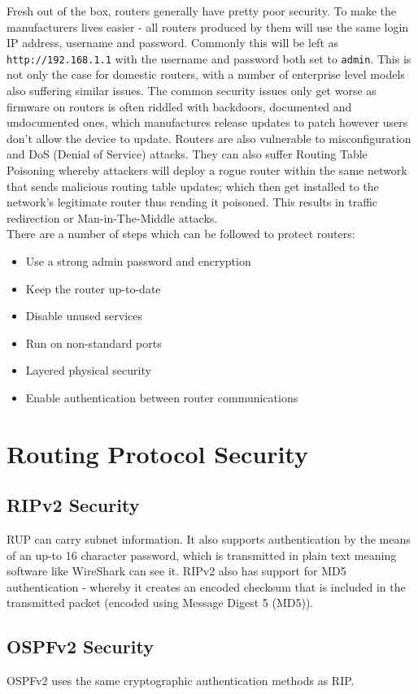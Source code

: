 Fresh out of the box, routers generally have pretty poor security. To make the manufacturers lives easier - all routers produced by them will use the same login IP address, username and password. Commonly this will be left as \verb|http://192.168.1.1| with the username and password both set to \verb|admin|. This is not only the case for domestic routers, with a number of enterprise level models also suffering similar issues. The common security issues only get worse as firmware on routers is often riddled with backdoors, documented and undocumented ones, which manufactures release updates to patch however users don't allow the device to update. Routers are also vulnerable to misconfiguration and DoS (Denial of Service) attacks. They can also suffer Routing Table Poisoning whereby attackers will deploy a rogue router within the same network that sends malicious routing table updates; which then get installed to the network's legitimate router thus rending it poisoned. This results in traffic redirection or Man-in-The-Middle attacks.\\

There are a number of steps which can be followed to protect routers:
\begin{itemize}
    \item Use a strong admin password and encryption
    \item Keep the router up-to-date
    \item Disable unused services
    \item Run on non-standard ports
    \item Layered physical security
    \item Enable authentication between router communications
\end{itemize}

\section{Routing Protocol Security}
\subsection{RIPv2 Security}
RUP can carry subnet information. It also supports authentication by the means of an up-to 16 character password, which is transmitted in plain text meaning software like WireShark can see it. RIPv2 also has support for MD5 authentication - whereby it creates an encoded checksum that is included in the transmitted packet (encoded using Message Digest 5 (MD5)). 

\subsection{OSPFv2 Security}
OSPFv2 uses the same cryptographic authentication methods as RIP. 